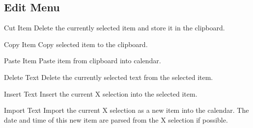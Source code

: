 \documentclass[a4paper,english]{article}
\begin{document}
    \subsection{Edit Menu}
        \begin{Description}\setlength{\itemsep}{0cm}
        \item[Cut Item]
            Delete the currently selected item and store it in the
            clipboard.

        \item[Copy Item]
            Copy selected item to the clipboard.

        \item[Paste Item]
            Paste item from clipboard into calendar.

        \item[Delete Text]
            Delete the currently selected text from the selected item.

        \item[Insert Text]
            Insert the current X selection into the selected item.

        \item[Import Text]
            Import the current X selection as a new item into the
            calendar.  The date and time of this new item are parsed
            from the X selection if possible.

        \end{Description}
\end{document}

